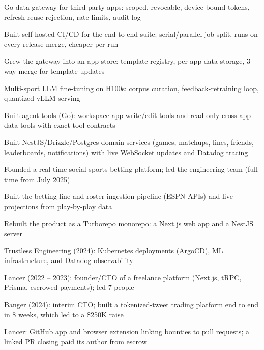 \documentclass[print]{jack-resume}
\begin{document}
\begin{tightemize}
    \item Go data gateway for third-party apps: scoped, revocable, device-bound tokens, refresh-reuse rejection, rate limits, audit log
    \item Built self-hosted CI/CD for the end-to-end suite: serial/parallel job split, runs on every release merge, cheaper per run
    \item Grew the gateway into an app store: template registry, per-app data storage, 3-way merge for template updates
    \item Multi-sport LLM fine-tuning on H100s: corpus curation, feedback-retraining loop, quantized vLLM serving
    \item Built agent tools (Go): workspace app write/edit tools and read-only cross-app data tools with exact tool contracts
\end{tightemize}
\sectionsep

\begin{tightemize}
    \item Built NestJS/Drizzle/Postgres domain services (games, matchups, lines, friends, leaderboards, notifications) with live WebSocket updates and Datadog tracing
    \item Founded a real-time social sports betting platform; led the engineering team (full-time from July 2025)
    \item Built the betting-line and roster ingestion pipeline (ESPN APIs) and live projections from play-by-play data
    \item Rebuilt the product as a Turborepo monorepo: a Next.js web app and a NestJS server
\end{tightemize}
\sectionsep

\begin{tightemize}
    \item Trustless Engineering (2024): Kubernetes deployments (ArgoCD), ML infrastructure, and Datadog observability
    \item Lancer (2022 -- 2023): founder/CTO of a freelance platform (Next.js, tRPC, Prisma, escrowed payments); led 7 people
    \item Banger (2024): interim CTO; built a tokenized-tweet trading platform end to end in 8 weeks, which led to a \$250K raise
    \item Lancer: GitHub app and browser extension linking bounties to pull requests; a linked PR closing paid its author from escrow
\end{tightemize}
\sectionsep
\end{document}
